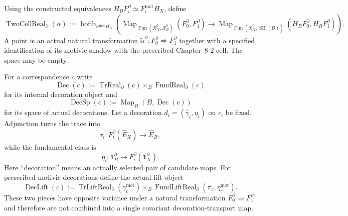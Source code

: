 \begin{definition}
\label{def:prequantum-two-cell-lift-realization}
Using the constructed equivalences
$H_BF_i^\partial\simeq F_i^{\mathrm{mot}}H_X$, define
\[
\boxed{
\operatorname{TwoCellReal}_{\partial}(\alpha)
:=
\operatorname{hofib}_{\alpha^{\mathrm{mot}}H_X}
\left(
\operatorname{Map}_{\operatorname{Fun}(\mathcal R_X^0,\mathcal R_B^0)}
(F_0^\partial,F_1^\partial)
\longrightarrow
\operatorname{Map}_{\operatorname{Fun}(\mathcal R_X^0,\operatorname{SH}(B))}
(H_BF_0^\partial,H_BF_1^\partial)
\right).
}
\]
A point is an actual natural transformation
$\widetilde\alpha^\partial:F_0^\partial\Rightarrow F_1^\partial$ together with a
specified identification of its motivic shadow with the prescribed Chapter~8
$2$-cell.  The space may be empty.
\end{definition}

For a correspondence $c$ write
\[
\operatorname{Dec}(c)
:=
\operatorname{TrReal}_{\partial}(c)
\times_B
\operatorname{FundReal}_{\partial}(c)
\]
for its internal decoration object and
\[
\operatorname{DecSp}(c):=\operatorname{Map}_B(B,\operatorname{Dec}(c))
\]
for its space of actual decorations.  Let a decoration
$d_i=(\widehat\gamma_i,\eta_i)$ on $c_i$ be fixed.  Adjunction turns the trace into
\[
\tau_i:
F_i^{\partial}(\widehat E_X)
\longrightarrow
\widehat E_B,
\]
while the fundamental class is
\[
\eta_i:
\mathbf1_B^{\partial}
\longrightarrow
F_i^{\partial}(\mathbf1_X^{\partial}).
\]
Here ``decoration'' means an actually selected pair of candidate maps.  For
prescribed motivic decorations define the actual lift object
\[
\operatorname{DecLift}(c)
:=
\operatorname{TrLiftReal}_{\partial}(\gamma_c^{\mathrm{mot}})
\times_B
\operatorname{FundLiftReal}_{\partial}(\pi_c;\eta_c^{\mathrm{mot}}).
\]
These two pieces have opposite variance under a natural transformation
$F_0^{\partial}\Rightarrow F_1^{\partial}$ and therefore are not combined into a
single covariant decoration-transport map.

